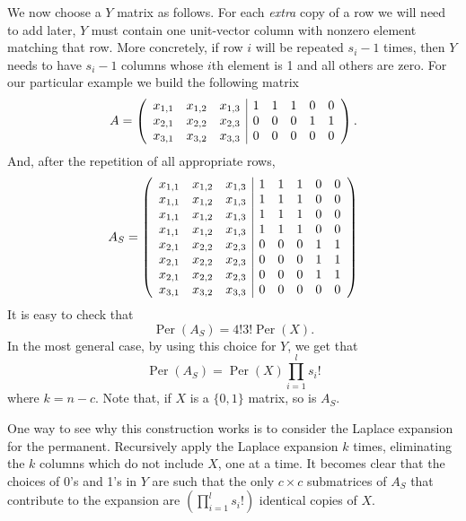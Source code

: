 \documentclass[11pt]{article}
\theoremstyle{plain}
\theoremstyle{plain}
\theoremstyle{plain}
\theoremstyle{plain}
\theoremstyle{plain}
\theoremstyle{plain}
\theoremstyle{plain}
\theoremstyle{remark}
\theoremstyle{remark}
\theoremstyle{plain}
\theoremstyle{plain}
\theoremstyle{plain}
\theoremstyle{plain}
\newcommand{\Per}{\operatorname{Per}}
\begin{document}
We now choose a $Y$ matrix as follows. For each \emph{extra} copy of a row we will need to add later, $Y$ must contain one unit-vector column with nonzero element matching that row. More concretely, if row $i$ will be repeated $s_i-1$ times, then $Y$ needs to have $s_i-1$ columns whose $i$th element is 1 and all others are zero. For our particular example we build the following matrix
\begin{equation} A= \label{eq:example}
\left(\begin{array}{ c c c | c c c c c}
x_{1,1} & x_{1,2} & x_{1,3} & 1 & 1 & 1 & 0 & 0 \\
x_{2,1} & x_{2,2} & x_{2,3} & 0 & 0 & 0 & 1 & 1\\
x_{3,1} & x_{3,2} & x_{3,3} & 0 & 0 & 0 & 0 & 0
\end{array}\right).
\end{equation}
And, after the repetition of all appropriate rows,
\begin{equation}
A_S = \left(\begin{array}{ c c c | c c c c c}
x_{1,1} & x_{1,2} & x_{1,3} & 1 & 1 & 1 & 0 & 0 \\
x_{1,1} & x_{1,2} & x_{1,3} & 1 & 1 & 1 & 0 & 0\\
x_{1,1} & x_{1,2} & x_{1,3} & 1 & 1 & 1 & 0 & 0\\
x_{1,1} & x_{1,2} & x_{1,3} & 1 & 1 & 1 & 0 & 0\\
x_{2,1} & x_{2,2} & x_{2,3} & 0 & 0 & 0 & 1 &  1\\
x_{2,1} & x_{2,2} & x_{2,3} & 0 & 0 & 0 & 1 &  1\\
x_{2,1} & x_{2,2} & x_{2,3} & 0 & 0 & 0 & 1 &  1\\
x_{3,1} & x_{3,2} & x_{3,3} & 0 & 0 & 0 & 0 & 0
\end{array}\right)
\end{equation}
It is easy to check that 
\begin{equation}
\Per(A_S) = 4!3!\Per(X).
\end{equation}
In the most general case, by using this choice for $Y$, we get that
\begin{equation}\label{eq:PerAsPoly}
\Per(A_S) = \Per(X) \prod_{i=1}^l s_i!
\end{equation}
where $k = n-c$. Note that, if $X$ is a $\{0,1\}$ matrix, so is $A_S$.

One way to see why this construction works is to consider the Laplace expansion for the permanent. Recursively apply the Laplace expansion $k$ times, eliminating the $k$ columns which do not include $X$, one at a time. It becomes clear that the choices of 0's and 1's in $Y$ are such that the only $c \times c$ submatrices of $A_S$ that contribute to the expansion are $(\prod_{i=1}^l s_i!)$ identical copies of $X$. 
\end{document}
